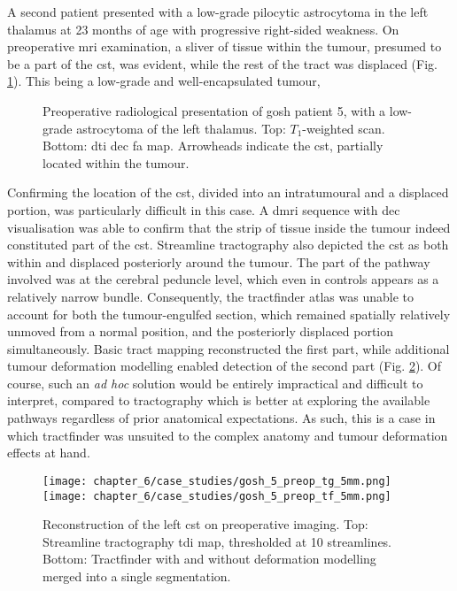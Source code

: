 A second patient presented with a low-grade pilocytic astrocytoma in the left thalamus at 23 months of age with progressive right-sided weakness.
On preoperative \gls{mri} examination, a sliver of tissue within the tumour, presumed to be a part of the \gls{cst}, was evident, while the rest of the tract was displaced (Fig. \ref{fig:5p}).
This being a low-grade and well-encapsulated tumour,

\begin{figure}[htb!]
  \centering
  
  
  \caption{Preoperative radiological presentation of \gls{gosh} patient 5, with a low-grade astrocytoma of the left thalamus. Top: $T_1$-weighted scan. Bottom: \gls{dti} \gls{dec} \gls{fa} map. Arrowheads indicate the \gls{cst}, partially located within the tumour.}
  \label{fig:5p}
\end{figure}

Confirming the location of the \gls{cst}, divided into an intratumoural and a displaced portion, was particularly difficult in this case.
A \gls{dmri} sequence with \gls{dec} visualisation was able to confirm that the strip of tissue inside the tumour indeed constituted part of the \gls{cst}.
Streamline tractography also depicted the \gls{cst} as both within and displaced posteriorly around the tumour.
The part of the pathway involved was at the cerebral peduncle level, which even in controls appears as a relatively narrow bundle.
Consequently, the tractfinder atlas was unable to account for both the tumour-engulfed section, which remained spatially relatively unmoved from a normal position, and the posteriorly displaced portion simultaneously.
Basic tract mapping reconstructed the first part, while additional tumour deformation modelling enabled detection of the second part (Fig. \ref{fig:5p_cst}).
Of course, such an \textit{ad hoc} solution would be entirely impractical and difficult to interpret, compared to tractography which is better at exploring the available pathways regardless of prior anatomical expectations.
As such, this is a case in which tractfinder was unsuited to the complex anatomy and tumour deformation effects at hand.

\begin{figure}[htb!]
  \centering
  \texttt{[image: chapter\_6/case\_studies/gosh\_5\_preop\_tg\_5mm.png]}
  \texttt{[image: chapter\_6/case\_studies/gosh\_5\_preop\_tf\_5mm.png]}
  \caption{Reconstruction of the left \gls{cst} on preoperative imaging. Top: Streamline tractography \gls{tdi} map, thresholded at 10 streamlines. Bottom: Tractfinder with and without deformation modelling merged into a single segmentation.}
  \label{fig:5p_cst}
\end{figure}

